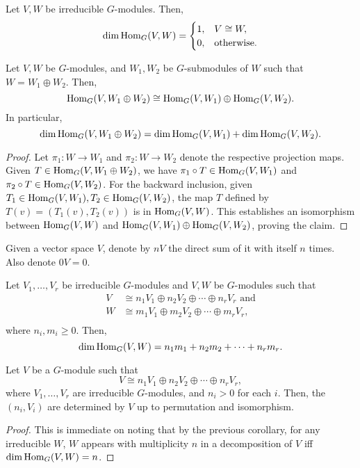 	\begin{fcor}
		Let $V,W$ be irreducible $G$-modules. Then,
		\[ \dim \operatorname{Hom}_G(V,W) = \begin{cases} 1, & V \cong W, \\ 0, & \text{otherwise.} \end{cases} \]
	\end{fcor}

	\begin{flem}
		Let $V,W$ be $G$-modules, and $W_1,W_2$ be $G$-submodules of $W$ such that $W = W_1 \oplus W_2$. Then,
		\[ \operatorname{Hom}_G(V,W_1\oplus W_2) \cong \operatorname{Hom}_G(V,W_1) \oplus \operatorname{Hom}_G(V,W_2). \]
		In particular,
		\[ \dim \operatorname{Hom}_G(V,W_1 \oplus W_2) = \dim \operatorname{Hom}_G(V,W_1) + \dim \operatorname{Hom}_G(V,W_2). \]
	\end{flem}
	\begin{proof}
		Let $\pi_1 : W \to W_1$ and $\pi_2 : W \to W_2$ denote the respective projection maps. Given $T \in \operatorname{Hom}_G(V,W_1\oplus W_2)$, we have $\pi_1 \circ T \in \operatorname{Hom}_G(V,W_1)$ and $\pi_2 \circ T \in \operatorname{Hom}_G(V,W_2)$. For the backward inclusion, given $T_1 \in \operatorname{Hom}_G(V,W_1), T_2 \in \operatorname{Hom}_G(V,W_2)$, the map $T$ defined by $T(v) = (T_1(v),T_2(v))$ is in $\operatorname{Hom}_G(V,W)$. This establishes an isomorphism between $\operatorname{Hom}_G(V,W)$ and $\operatorname{Hom}_G(V,W_1) \oplus \operatorname{Hom}_G(V,W_2)$, proving the claim.
	\end{proof}

	Given a vector space $V$, denote by $nV$ the direct sum of it with itself $n$ times. Also denote $0V = 0$.

	\begin{fcor}
		Let $V_1,\ldots,V_r$ be irreducible $G$-modules and $V,W$ be $G$-modules such that
		\begin{align*}
			V &\cong n_1V_1 \oplus n_2V_2 \oplus \cdots \oplus n_rV_r \text{ and} \\
			W &\cong m_1V_1 \oplus m_2V_2 \oplus \cdots \oplus m_rV_r, \\
		\end{align*} 
		where $n_i,m_i \ge 0$. Then,
		\[ \dim \operatorname{Hom}_G(V,W) = n_1m_1 + n_2m_2 + \cdots + n_rm_r. \]
	\end{fcor}

	\begin{fcor}
		Let $V$ be a $G$-module such that
		\[ V \cong n_1V_1 \oplus n_2V_2 \oplus \cdots \oplus n_rV_r, \]
		where $V_1,\ldots,V_r$ are irreducible $G$-modules, and $n_i > 0$ for each $i$. Then, the $(n_i,V_i)$ are determined by $V$ up to permutation and isomorphism. 
	\end{fcor}
	\begin{proof}
		This is immediate on noting that by the previous corollary, for any irreducible $W$, $W$ appears with multiplicity $n$ in a decomposition of $V$ iff $\dim \operatorname{Hom}_G(V,W) = n$.
	\end{proof}

